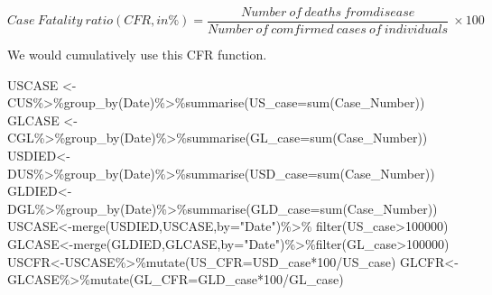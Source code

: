 \documentclass[
]{article}
\newenvironment{Shaded}{\begin{snugshade}}{\end{snugshade}}
\newcommand{\AttributeTok}[1]{\textcolor[rgb]{0.77,0.63,0.00}{#1}}
\newcommand{\DecValTok}[1]{\textcolor[rgb]{0.00,0.00,0.81}{#1}}
\newcommand{\FunctionTok}[1]{\textcolor[rgb]{0.00,0.00,0.00}{#1}}
\newcommand{\NormalTok}[1]{#1}
\newcommand{\OtherTok}[1]{\textcolor[rgb]{0.56,0.35,0.01}{#1}}
\newcommand{\SpecialCharTok}[1]{\textcolor[rgb]{0.00,0.00,0.00}{#1}}
\newcommand{\StringTok}[1]{\textcolor[rgb]{0.31,0.60,0.02}{#1}}
\begin{document}
\[
  Case\ Fatality\  ratio(CFR,in\%) = \frac{Number\ of\ deaths\ from disease}{Number\ of\ comfirmed\ cases \ of\ individuals} \ \times 100 
\]

We would cumulatively use this CFR function.

\begin{Shaded}
\begin{Highlighting}[]
\NormalTok{USCASE }\OtherTok{\textless{}{-}}\NormalTok{CUS}\SpecialCharTok{\%\textgreater{}\%}\FunctionTok{group\_by}\NormalTok{(Date)}\SpecialCharTok{\%\textgreater{}\%}\FunctionTok{summarise}\NormalTok{(}\AttributeTok{US\_case=}\FunctionTok{sum}\NormalTok{(Case\_Number))}
\NormalTok{GLCASE }\OtherTok{\textless{}{-}}\NormalTok{CGL}\SpecialCharTok{\%\textgreater{}\%}\FunctionTok{group\_by}\NormalTok{(Date)}\SpecialCharTok{\%\textgreater{}\%}\FunctionTok{summarise}\NormalTok{(}\AttributeTok{GL\_case=}\FunctionTok{sum}\NormalTok{(Case\_Number))}
\NormalTok{USDIED}\OtherTok{\textless{}{-}}\NormalTok{DUS}\SpecialCharTok{\%\textgreater{}\%}\FunctionTok{group\_by}\NormalTok{(Date)}\SpecialCharTok{\%\textgreater{}\%}\FunctionTok{summarise}\NormalTok{(}\AttributeTok{USD\_case=}\FunctionTok{sum}\NormalTok{(Case\_Number))}
\NormalTok{GLDIED}\OtherTok{\textless{}{-}}\NormalTok{DGL}\SpecialCharTok{\%\textgreater{}\%}\FunctionTok{group\_by}\NormalTok{(Date)}\SpecialCharTok{\%\textgreater{}\%}\FunctionTok{summarise}\NormalTok{(}\AttributeTok{GLD\_case=}\FunctionTok{sum}\NormalTok{(Case\_Number))}
\NormalTok{USCASE}\OtherTok{\textless{}{-}}\FunctionTok{merge}\NormalTok{(USDIED,USCASE,}\AttributeTok{by=}\StringTok{"Date"}\NormalTok{)}\SpecialCharTok{\%\textgreater{}\%} \FunctionTok{filter}\NormalTok{(US\_case}\SpecialCharTok{\textgreater{}}\DecValTok{100000}\NormalTok{)}
\NormalTok{GLCASE}\OtherTok{\textless{}{-}}\FunctionTok{merge}\NormalTok{(GLDIED,GLCASE,}\AttributeTok{by=}\StringTok{"Date"}\NormalTok{)}\SpecialCharTok{\%\textgreater{}\%}\FunctionTok{filter}\NormalTok{(GL\_case}\SpecialCharTok{\textgreater{}}\DecValTok{100000}\NormalTok{)}
\NormalTok{USCFR}\OtherTok{\textless{}{-}}\NormalTok{USCASE}\SpecialCharTok{\%\textgreater{}\%}\FunctionTok{mutate}\NormalTok{(}\AttributeTok{US\_CFR=}\NormalTok{USD\_case}\SpecialCharTok{*}\DecValTok{100}\SpecialCharTok{/}\NormalTok{US\_case)}
\NormalTok{GLCFR}\OtherTok{\textless{}{-}}\NormalTok{GLCASE}\SpecialCharTok{\%\textgreater{}\%}\FunctionTok{mutate}\NormalTok{(}\AttributeTok{GL\_CFR=}\NormalTok{GLD\_case}\SpecialCharTok{*}\DecValTok{100}\SpecialCharTok{/}\NormalTok{GL\_case)}
\end{Highlighting}
\end{Shaded}
\end{document}

